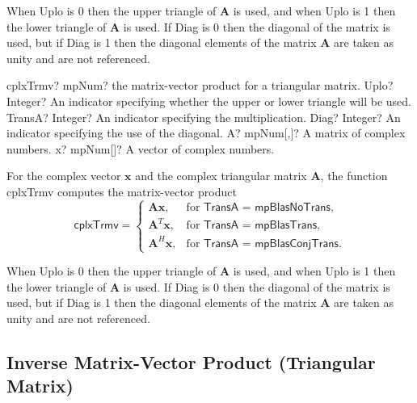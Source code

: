 When \textsf{Uplo} is 0 then the upper triangle of $\boldsymbol{A}$ is used, and when \textsf{Uplo} is 1 then the lower triangle of $\boldsymbol{A}$ is used. If \textsf{Diag} is 0 then the diagonal of the matrix is used, but if \textsf{Diag} is 1 then the diagonal elements of the matrix $\boldsymbol{A}$ are taken as unity and are not referenced. 



\vspace{0.6cm}
\begin{mpFunctionsExtract}
	\mpFunctionFive
	{cplxTrmv? mpNum?  the matrix-vector product for a triangular matrix.}
	{Uplo? Integer? An indicator specifying whether the upper or lower triangle will be used.}
	{TransA? Integer? An indicator specifying the multiplication.}
	{Diag? Integer? An indicator specifying the use of the diagonal.}
	{A? mpNum[,]? A matrix of complex numbers.}
	{x? mpNum[]? A vector of complex numbers.}
\end{mpFunctionsExtract}


\vspace{0.3cm}
For the complex vector $\boldsymbol{x}$ and the complex triangular matrix $\boldsymbol{A}$, the function \textsf{cplxTrmv} computes the matrix-vector product
\begin{equation}
\textsf{cplxTrmv}=\begin{cases}
\boldsymbol{A} \boldsymbol{x}, & \text{for } \textsf{TransA = mpBlasNoTrans},\\
\boldsymbol{A}^T \boldsymbol{x}, & \text{for } \textsf{TransA = mpBlasTrans},\\
\boldsymbol{A}^H \boldsymbol{x}, & \text{for } \textsf{TransA = mpBlasConjTrans}.
\end{cases}
\end{equation}

When \textsf{Uplo} is 0 then the upper triangle of $\boldsymbol{A}$ is used, and when \textsf{Uplo} is 1 then the lower triangle of $\boldsymbol{A}$ is used. If \textsf{Diag} is 0 then the diagonal of the matrix is used, but if \textsf{Diag} is 1 then the diagonal elements of the matrix $\boldsymbol{A}$ are taken as unity and are not referenced. 





\newpage
\subsection{Inverse Matrix-Vector Product (Triangular Matrix)}

